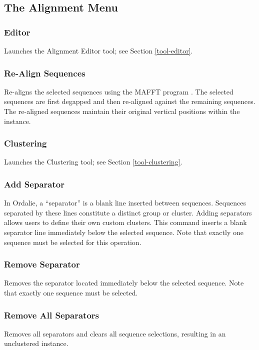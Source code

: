 \documentclass[a4paper]{article}
\begin{document}
\subsection{The Alignment Menu}
\subsubsection{Editor}
Launches the Alignment Editor tool; see Section \ref{tool-editor}.

\subsubsection{Re-Align Sequences}
Re-aligns the selected sequences using the MAFFT program \cite{soft:mafft, soft:mafft2, soft:mafft3, soft:mafft4}. The selected sequences are first degapped and then re-aligned against the remaining sequences. The re-aligned sequences maintain their original vertical positions within the instance.

\subsubsection{Clustering}
Launches the Clustering tool; see Section \ref{tool-clustering}.

\subsubsection{Add Separator}
In Ordalie, a ``separator'' is a blank line inserted between sequences. Sequences separated by these lines constitute a distinct group or cluster. Adding separators allows users to define their own custom clusters. This command inserts a blank separator line immediately below the selected sequence. Note that exactly one sequence must be selected for this operation.

\subsubsection{Remove Separator}
Removes the separator located immediately below the selected sequence. Note that exactly one sequence must be selected.

\subsubsection{Remove All Separators}
Removes all separators and clears all sequence selections, resulting in an unclustered instance.
\end{document}
